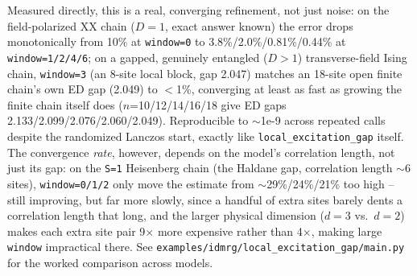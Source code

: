 \documentclass[11pt]{article}
\begin{document}
Measured directly, this is a real, converging refinement, not just noise:
on the field-polarized XX chain ($D=1$, exact answer known) the error
drops monotonically from 10\% at \texttt{window=0} to
3.8\%/2.0\%/0.81\%/0.44\% at \texttt{window=1/2/4/6}; on a gapped,
genuinely entangled ($D>1$) transverse-field Ising chain,
\texttt{window=3} (an 8-site local block, gap 2.047) matches an 18-site
open finite chain's own ED gap (2.049) to $<$1\%, converging at least as
fast as growing the finite chain itself does ($n$=10/12/14/16/18 give ED
gaps 2.133/2.099/2.076/2.060/2.049). Reproducible to $\sim$1e-9 across
repeated calls despite the randomized Lanczos start, exactly like
\texttt{local\_excitation\_gap} itself. The convergence \emph{rate},
however, depends on the model's correlation length, not just its gap: on
the \texttt{S=1} Heisenberg chain (the Haldane gap, correlation length
$\sim$6 sites), \texttt{window=0/1/2} only move the estimate from
$\sim$29\%/24\%/21\% too high -- still improving, but far more slowly,
since a handful of extra sites barely dents a correlation length that
long, and the larger physical dimension ($d=3$ vs.\ $d=2$) makes each
extra site pair 9$\times$ more expensive rather than 4$\times$, making
large \texttt{window} impractical there. See
\texttt{examples/idmrg/local\_excitation\_gap/main.py} for the worked
comparison across models.
\end{document}
